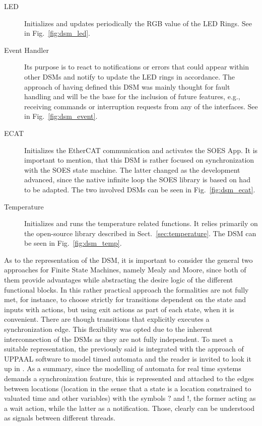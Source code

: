 \begin{description}
\item[LED] Initializes and updates periodically the RGB value of the LED Rings. See in Fig.~\ref{fig:dsm_led}.
\item[Event Handler] Its purpose is to react to notifications or errors that could appear within other DSMs and notify to update the LED rings in accordance.
                    The approach of having defined this DSM was mainly thought for fault handling and will be the base for the inclusion of future features, e.g.,
                    receiving commands or interruption requests from any of the interfaces. See in Fig.~\ref{fig:dsm_event}.
\item[ECAT] Initializes the EtherCAT communication and activates the SOES App. It is important to mention, that this DSM is rather focused on synchronization 
            with the SOES state machine. The latter changed as the development advanced, since the native infinite loop the SOES library is based on had to be adapted.
            The two involved DSMs can be seen in Fig.~\ref{fig:dsm_ecat}.
\item[Temperature] Initializes and runs the temperature related functions. It relies primarily on the open-source library described in Sect.~\ref{sec:temperature}. 
            The DSM can be seen in Fig.~\ref{fig:dsm_temp}.

\end{description}

As to the representation of the DSM, it is important to consider the general two approaches for Finite State Machines, namely Mealy and Moore, since both 
of them provide advantages while abstracting the desire logic of the different functional blocks. In this rather practical approach the formalities are not fully
met, for instance, to choose strictly for transitions dependent on the state and inputs with actions, but using exit actions as part of each state, when it is convenient.
There are though transitions that explicitly executes a synchronization edge. This flexibility was opted due to the inherent interconnection of the DSMs
as they are not fully independent. To meet a suitable representation, the previously said is integrated with the approach of UPPAAL 
software to model timed automata and the reader is invited to look it up in \cite{uppaal_tutorial}.
As a summary, since the modelling of automata for real time systems demands a synchronization feature, this is represented and attached to the edges between 
locations (location in the sense that a state is a location constrained to valuated time and other variables) with the symbols $?$ and $!$, the former acting as 
a wait action, while the latter as a notification. Those, clearly can be understood as signals between different threads.


